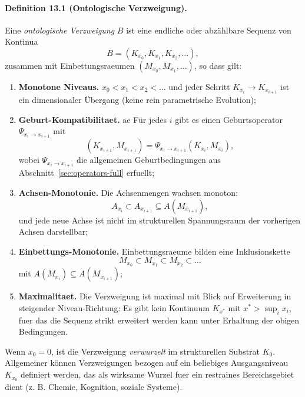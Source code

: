 \paragraph{Definition 13.1 (Ontologische Verzweigung).}
Eine \emph{ontologische Verzweigung} \(B\) ist eine endliche oder abzählbare
Sequenz von Kontinua
\[
  B = (K_{x_0}, K_{x_1}, K_{x_2}, \dots),
\]
zusammen mit Einbettungsraeumen \((M_{x_0}, M_{x_1}, \dots)\), so dass gilt:
\begin{enumerate}
  \item \textbf{Monotone Niveaus.}\quad
        \(x_0 < x_1 < x_2 < \dots\) und jeder Schritt
        \(K_{x_i} \to K_{x_{i+1}}\) ist ein dimensionaler Übergang
        (keine rein parametrische Evolution);
  \item \textbf{Geburt-Kompatibilitaet.}\quad
ae
        Für jedes \(i\) gibt es einen Geburtsoperator
        \(\Psi_{x_i\to x_{i+1}}\) mit
        \[
          (K_{x_{i+1}}, M_{x_{i+1}}) =
            \Psi_{x_i\to x_{i+1}}(K_{x_i}, M_{x_i}),
        \]
        wobei \(\Psi_{x_i\to x_{i+1}}\) die allgemeinen Geburtbedingungen aus
        Abschnitt~\ref{sec:operators-full} erfuellt;
  \item \textbf{Achsen-Monotonie.}\quad
        Die Achsenmengen wachsen monoton:
        \[
          A_{x_i} \subset A_{x_{i+1}}
          \subseteq A(M_{x_{i+1}}),
        \]
        und jede neue Achse ist nicht im strukturellen Spannungsraum der
        vorherigen Achsen darstellbar;
  \item \textbf{Einbettungs-Monotonie.}\quad
        Einbettungsraeume bilden eine Inklusionskette
        \[
          M_{x_0} \subset M_{x_1} \subset M_{x_2} \subset \dots
        \]
        mit \(A(M_{x_i}) \subseteq A(M_{x_{i+1}})\);
  \item \textbf{Maximalitaet.}\quad
        Die Verzweigung ist maximal mit Blick auf Erweiterung in steigender
        Niveau-Richtung: Es gibt kein Kontinuum \(K_{x^{\ast}}\) mit
        \(x^{\ast} > \sup_i x_i\), fuer das die Sequenz strikt erweitert werden
        kann unter Erhaltung der obigen Bedingungen.
\end{enumerate}

Wenn \(x_0 = 0\), ist die Verzweigung \emph{verwurzelt} im strukturellen
Substrat \(K_0\). Allgemeiner können Verzweigungen bezogen auf ein beliebiges
Ausgangsniveau \(K_{x_0}\) definiert werden, das als wirksame Wurzel fuer ein
restraines Bereichsgebiet dient (z. B. Chemie, Kognition, soziale Systeme).

